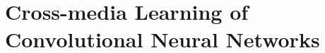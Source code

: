 
\graphicspath{{img/vsa/}}

\chapter{Cross-media Learning of Convolutional Neural Networks}
\label{ch:cross-media}

